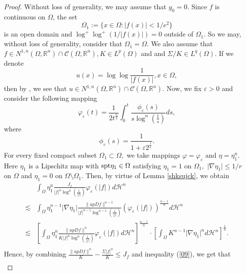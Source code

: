 \documentclass[11pt,twoside]{article}
\theoremstyle{definition}
\theoremstyle{remark}
\newcommand{\abs}[1]{\left|#1\right|}
\newcommand{\aleq}{\lesssim}
\begin{document}
\begin{proof}
Without loss of generality, we may assume that $y_{0}=0.$ Since $ f$ is continuous on $\Omega$,  the set $$\Omega_{1}:=\{x\in\Omega:\abs{f(x)}<1/e^{2}\}$$ is an open domain and $\log^{+}\log^{+}(1/\vert f(x)\vert) =0$ outside of $\Omega_{1}.$ So we may, without loss of generality, consider that $\Omega_{1}=\Omega.$  We also assume that $f\in N^{1,n}(\Omega,\mathbb{R}^{n})\cap \mathcal{C}(\Omega,\mathbb{R}^{n}),K\in L^{p}(\Omega)$ and and $\Sigma/K\in L^{q}(\Omega).$ If we denote $$u(x)=\log\log\frac{1}{\vert f(x)\vert},x\in\Omega,$$ then by \cite[Proposition 2.17]{BB11}, we see that 
$u\in N^{1,n}(\Omega,\mathbb{R}^{n})\cap \mathcal{C}(\Omega,\mathbb{R}^{n}).$ Now, we fix $\varepsilon>0$ and consider the following mapping 
$$\varphi_{\varepsilon}(t)=\frac{1}{2t^{\frac{n}{2}}}\int_{0}^{t}\frac{\phi_{\varepsilon}(s)}{s\log^{n}(\frac{1}{s})}ds,$$
where $$\phi_{\varepsilon}(s)=\frac{1}{1+\varepsilon2^{\frac{1}{s}}}.$$
For every fixed compact subset $\Omega_{1}\subset\Omega,$ we take mappings $\varphi=\varphi_{\varepsilon}$ and $\eta=\eta_{1}^{n}.$ Here $\eta_{1}$ is a Lipschitz map with ${\rm spt}\eta_{1}\in \Omega$ satisfying $\eta_{1}=1$ on $\Omega_{1},$ $\vert\nabla\eta_{1}\vert\leq1/r$ on $\Omega$ and $\eta_{1}=0$ on $\Omega\setminus\Omega_{1}.$
Then, by  virtue of Lemma \ref{shksujck}, we obtain 
\begin{equation}\label{09}
\begin{aligned}
&\int_{\Omega}\eta_{1}^{n}\frac{J_{f}}{\abs{f}^{n}\log^{n}(\frac{1}{\abs{f}})}\varphi_{\varepsilon}(\abs{f})d\mathcal{H}^{n}\\
\aleq& \int_{\Omega}\eta_{1}^{n-1}\vert\nabla\eta_{1}\vert\frac{\parallel ap Df\parallel^{n-1}}{\vert f\vert^{n-1}\log^{n-1}(\frac{1}{\vert f\vert})}\left(\varphi_{\varepsilon}(\vert f\vert)\right)^{\frac{n-1}{n}}d\mathcal{H}^{n}\\
\aleq&  \left[\int_{\Omega}\eta_{1}^{n}\frac{\parallel ap Df\parallel^{n}}{K\vert f\vert^{n}\log^{n}(\frac{1}{\vert f\vert})}\varphi_{\varepsilon}(\vert  f\vert)d\mathcal{H}^{n}\right]^{\frac{n-1}{n}}\cdot\left[\int_{\Omega}K^{n-1}\vert\nabla\eta_{1}\vert^{n}d\mathcal{H}^{n}\right]^{\frac{1}{n}}.\\
\end{aligned}
\end{equation}
Hence,  by combining $\frac{\parallel ap Df\parallel^{n}}{K}-\frac{\Sigma\vert f\vert^{n}}{K}\leq J_{f}$ and inequality (\ref{09}), we get that 
\begin{equation}\label{07}
\begin{aligned}

\end{aligned}
\end{equation}
\end{proof}
\end{document}
